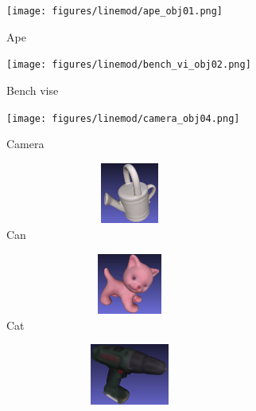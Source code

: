\documentclass[../main.tex]{subfiles}
\begin{document}
\begin{figure}[H]
    \centering
    \begin{subfigure}[t]{0.19\textwidth}
        \centering
        \captionsetup{width=.9\textwidth}
        \texttt{[image: figures/linemod/ape\_obj01.png]}
        \caption{Ape}
        \label{subfig:obj_ape}
    \end{subfigure}
    \begin{subfigure}[t]{0.19\textwidth}
        \centering
        \captionsetup{width=.9\textwidth}
        \texttt{[image: figures/linemod/bench\_vi\_obj02.png]}
        \caption{Bench vise}
        \label{subfig:obj_bench_vi}
    \end{subfigure}
    \begin{subfigure}[t]{0.19\textwidth}
        \centering
        \captionsetup{width=.9\textwidth}
        \texttt{[image: figures/linemod/camera\_obj04.png]}
        \caption{Camera}
        \label{subfig:obj_camera}
    \end{subfigure}
    \begin{subfigure}[t]{0.19\textwidth}
        \centering
        \captionsetup{width=.9\textwidth}
        \includegraphics[width=0.9\textwidth, height=20mm, keepaspectratio]{figures/linemod/can_obj05.png}
        \caption{Can}
        \label{subfig:obj_can}
    \end{subfigure}
    \begin{subfigure}[t]{0.19\textwidth}
        \centering
        \captionsetup{width=.9\textwidth}
        \includegraphics[width=0.9\textwidth, height=20mm, keepaspectratio]{figures/linemod/cat_obj06.png}
        \caption{Cat}
        \label{subfig:obj_cat}
    \end{subfigure}
    \begin{subfigure}[t]{0.19\textwidth}
        \centering
        \captionsetup{width=.9\textwidth}
        \includegraphics[width=0.9\textwidth, height=20mm, keepaspectratio]{figures/linemod/drill_obj08.png}

\end{subfigure}
\end{figure}
\end{document}
